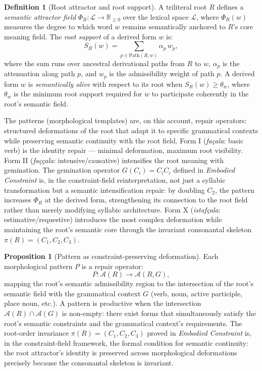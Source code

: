 \documentclass[11pt, a4paper]{article}
\theoremstyle{definition}
\newtheorem{definition}{Definition}
\newtheorem{proposition}{Proposition}
\theoremstyle{remark}
\begin{document}
\begin{definition}[Root attractor and root support]
A triliteral root $R$ defines a \textit{semantic attractor field} $\Phi_R:
\mathcal{L} \to \mathbb{R}_{\geq 0}$ over the lexical space $\mathcal{L}$,
where $\Phi_R(w)$ measures the degree to which word $w$ remains semantically
anchored to $R$'s core meaning field. The \textit{root support} of a derived
form $w$ is:
\[
S_R(w) = \sum_{p \in \mathrm{Path}(R, w)} \alpha_p\, w_p,
\]
where the sum runs over ancestral derivational paths from $R$ to $w$,
$\alpha_p$ is the attenuation along path $p$, and $w_p$ is the admissibility
weight of path $p$. A derived form $w$ is \textit{semantically alive} with
respect to its root when $S_R(w) \geq \theta_w$, where $\theta_w$ is the
minimum root support required for $w$ to participate coherently in the root's
semantic field.
\end{definition}

The patterns (morphological templates) are, on this account, repair operators:
structured deformations of the root that adapt it to specific grammatical
contexts while preserving semantic continuity with the root field. Form I
(\textit{fa\c{c}ala}: basic verb) is the identity repair --- minimal
deformation, maximum root visibility. Form II (\textit{fa\c{c}\c{c}ala}:
intensive/causative) intensifies the root meaning with gemination. The
gemination operator $G(C_i) = C_i C_i$ defined in \textit{Embodied
Constraint} is, in the constraint-field reinterpretation, not just a
syllabic transformation but a semantic intensification repair: by doubling
$C_2$, the pattern increases $\Phi_R$ at the derived form, strengthening
its connection to the root field rather than merely modifying syllabic
architecture. Form X (\textit{istaf\c{c}ala}: estimative/requestive)
introduces the most complex deformation while maintaining the root's semantic
core through the invariant consonantal skeleton $\pi(R) = (C_1, C_2, C_3)$.

\begin{proposition}[Pattern as constraint-preserving deformation]
Each morphological pattern $P$ is a repair operator:
\[
P: \mathcal{A}(R) \to \mathcal{A}(R, G),
\]
mapping the root's semantic admissibility region to the intersection of the
root's semantic field with the grammatical context $G$ (verb, noun, active
participle, place noun, etc.). A pattern is productive when the intersection
$\mathcal{A}(R) \cap \mathcal{A}(G)$ is non-empty: there exist forms that
simultaneously satisfy the root's semantic constraints and the grammatical
context's requirements. The root-order invariance $\pi(R) = (C_1, C_2, C_3)$
proved in \textit{Embodied Constraint} is, in the constraint-field framework,
the formal condition for semantic continuity: the root attractor's identity
is preserved across morphological deformations precisely because the
consonantal skeleton is invariant.
\end{proposition}
\end{document}
